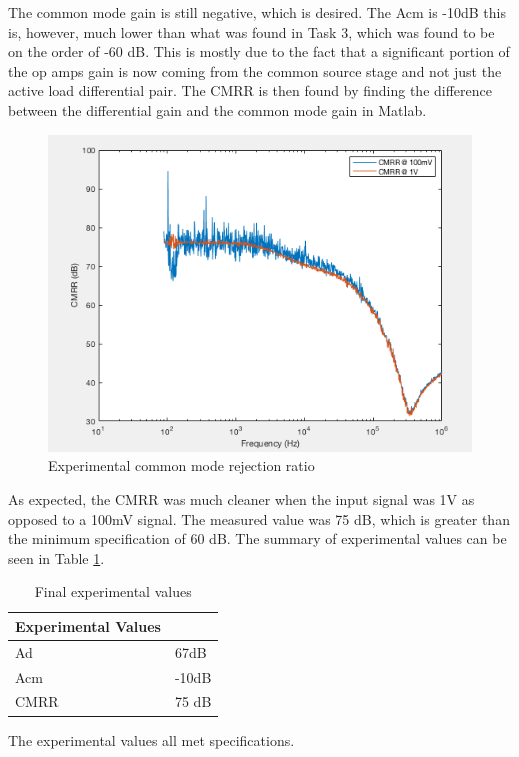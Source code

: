 The common mode gain is still negative, which is desired. The Acm is -10dB this is, however, much lower than what was found in Task 3, which was found to be on the order of -60 dB. This is mostly due to the fact that a significant portion of the op amps gain is now coming from the common source stage and not just the active load differential pair. The CMRR is then found by finding the difference between the differential gain and the common mode gain in Matlab.


\begin{figure}[H]
	\begin{center}
		\includegraphics[scale=.40]{ExperimentalImplementation/CMRR_fin.png}
		\caption{Experimental common mode rejection ratio}
		\label{fig:cmrr}
	\end{center}
\end{figure}

 As expected, the CMRR was much cleaner when the input signal was 1V as opposed to a 100mV signal. The measured value was 75 dB, which is greater than the minimum specification of 60 dB. The summary of experimental values can be seen in Table \ref{tab:expfin}.
 
 
 \begin{table}[H]
 	\centering
 	\caption{Final experimental values}
 	\label{tab:expfin}
 	\begin{tabular}{|l|l|}
 		\hline
 		\textbf{Experimental Values} &       \\ \hline
 		Ad                           & 67dB  \\ \hline
 		Acm                          & -10dB \\ \hline
 		CMRR                         & 75 dB \\ \hline
 	\end{tabular}
 \end{table}

The experimental values all met specifications.


 



